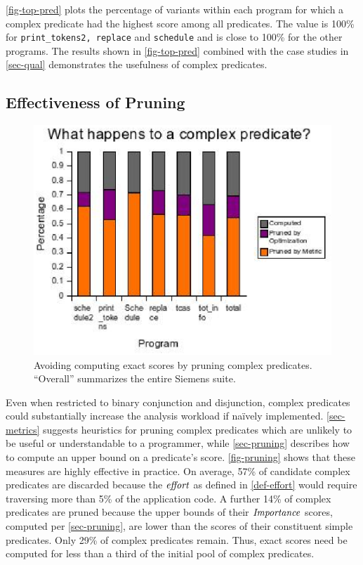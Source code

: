\autoref{fig-top-pred} plots the percentage of variants within each program for which a complex predicate had the highest score among all predicates.  The value is 100\% for \texttt{print\_tokens2, replace} and \texttt{schedule} and is close to 100\% for the other programs.  The results shown in \autoref{fig-top-pred} combined with the case studies in \autoref{sec-qual} demonstrates the usefulness of complex predicates.

\subsection{Effectiveness of Pruning}

\begin{figure}
  \centering
  \includegraphics{charts/pruning}
  \caption{Avoiding computing exact scores by pruning complex predicates.  ``Overall'' summarizes the entire Siemens suite.}
  \label{fig-pruning}
\end{figure}

Even when restricted to binary conjunction and disjunction, complex predicates could substantially increase the analysis workload if na\"ively implemented.  \autoref{sec-metrics} suggests heuristics for pruning complex predicates which are unlikely to be useful or understandable to a programmer, while \autoref{sec-pruning} describes how to compute an upper bound on a predicate's score.  \autoref{fig-pruning} shows that these measures are highly effective in practice.  On average, 57\% of candidate complex predicates are discarded because the $\mathit{effort}$ as defined in \autoref{def-effort} would require traversing more than 5\% of the application code.  A further 14\% of complex predicates are pruned because the upper bounds of their $\mathit{Importance}$ scores, computed per \autoref{sec-pruning}, are lower than the scores of their constituent simple predicates.  Only 29\% of complex predicates remain.  Thus, exact scores need be computed for less than a third of the initial pool of complex predicates.

